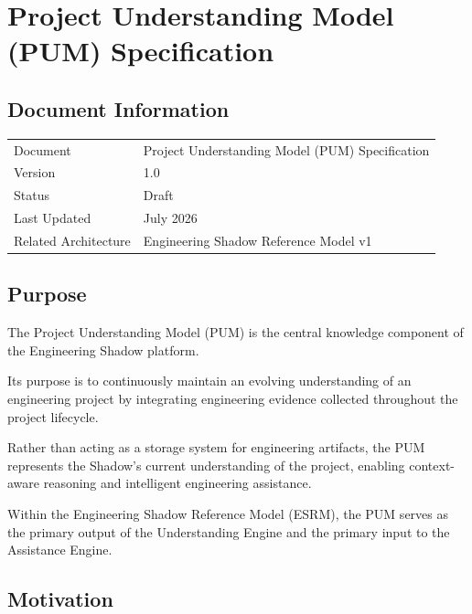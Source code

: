 \section{Project Understanding Model (PUM) Specification}

\subsection{Document Information}

\begin{table}[H]
\centering
\begin{tabular}{ll}
\toprule
Document & Project Understanding Model (PUM) Specification \\
Version & 1.0 \\
Status & Draft \\
Last Updated & July 2026 \\
Related Architecture & Engineering Shadow Reference Model v1 \\
\bottomrule
\end{tabular}
\end{table}


\subsection{Purpose}

The Project Understanding Model (PUM) is the central knowledge component of the Engineering Shadow platform.

Its purpose is to continuously maintain an evolving understanding of an engineering project by integrating engineering evidence collected throughout the project lifecycle.

Rather than acting as a storage system for engineering artifacts, the PUM represents the Shadow's current understanding of the project, enabling context-aware reasoning and intelligent engineering assistance.

Within the Engineering Shadow Reference Model (ESRM), the PUM serves as the primary output of the Understanding Engine and the primary input to the Assistance Engine.


\subsection{Motivation}

